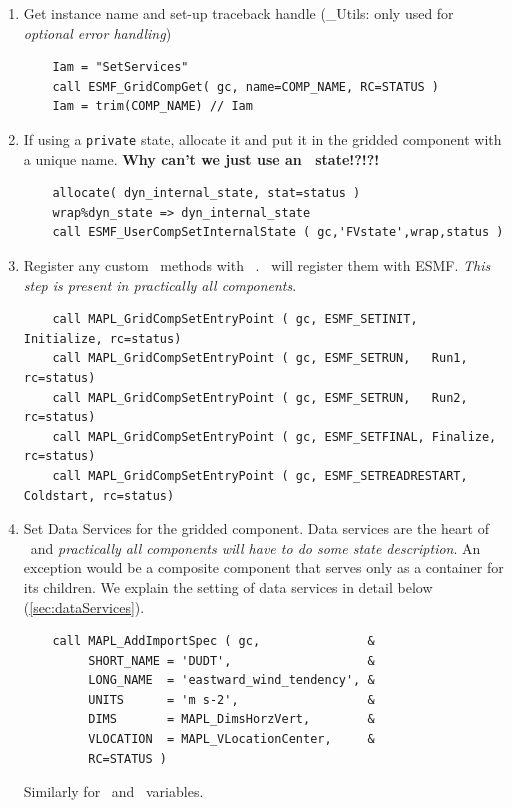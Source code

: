 \begin{enumerate}

\item Get instance name and set-up traceback handle  (\ggn\_Utils: only used
for \emph{optional error handling})
\begin{verbatim}
    Iam = "SetServices"
    call ESMF_GridCompGet( gc, name=COMP_NAME, RC=STATUS )
    Iam = trim(COMP_NAME) // Iam
\end{verbatim}

\item If using a \texttt{private} state, allocate it and put it
  in the gridded component with a unique name. \textbf{Why can't we just use
    an \gIN\ state!?!?!}
\begin{verbatim}
    allocate( dyn_internal_state, stat=status )
    wrap%dyn_state => dyn_internal_state
    call ESMF_UserCompSetInternalState ( gc,'FVstate',wrap,status )
\end{verbatim}

\item Register any custom \IRF\ methods with \ggn\ . \ggn\  will register
them with ESMF. \emph{This step is present in practically all components}.
\begin{verbatim}
    call MAPL_GridCompSetEntryPoint ( gc, ESMF_SETINIT,  Initialize, rc=status)
    call MAPL_GridCompSetEntryPoint ( gc, ESMF_SETRUN,   Run1, rc=status)
    call MAPL_GridCompSetEntryPoint ( gc, ESMF_SETRUN,   Run2, rc=status)
    call MAPL_GridCompSetEntryPoint ( gc, ESMF_SETFINAL, Finalize, rc=status)
    call MAPL_GridCompSetEntryPoint ( gc, ESMF_SETREADRESTART, Coldstart, rc=status)
\end{verbatim}

\item Set Data Services for the gridded component. Data services are the
  heart of \ggn\ and \emph{practically all components will have to do some
    state description}. An exception would be a composite component that
  serves only as a container for its children. We explain the setting of
  data services in detail below (\ref{sec:dataServices}).
\begin{verbatim}
    call MAPL_AddImportSpec ( gc,               &
         SHORT_NAME = 'DUDT',                   &
         LONG_NAME  = 'eastward_wind_tendency', &
         UNITS      = 'm s-2',                  &
         DIMS       = MAPL_DimsHorzVert,        &
         VLOCATION  = MAPL_VLocationCenter,     &
         RC=STATUS )
\end{verbatim}
Similarly for \ex\ and \gin\ variables.


\end{enumerate}
